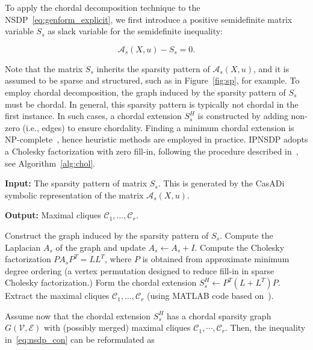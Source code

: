 \documentclass[]{interact}
\theoremstyle{plain}%
\theoremstyle{definition}
\theoremstyle{remark}
\begin{document}
To apply the chordal decomposition technique to the NSDP~\eqref{eq:genform_explicit}, we first introduce a positive semidefinite matrix variable $S_s$  as slack variable for  the  semidefinite inequality:

\begin{equation}\label{eq:nsdp_con}
\mathcal{A}_s(X,u) -S_s =0.
\end{equation}

Note that the matrix $S_s$ inherits the sparsity pattern of $\mathcal{A}_s(X,u)$, and it is assumed to be sparse and structured, such as in Figure~\ref{fig:sp}, for example. To employ chordal decomposition, the graph induced by the sparsity pattern of $S_s$ must be chordal. In general, this sparsity pattern is typically not chordal in the first instance. In such cases, a chordal extension $S_s^H$ is constructed by adding non-zero (i.e., edges) to ensure chordality. Finding a minimum chordal extension is NP-complete~\cite{Yannakakis81}, hence heuristic methods are employed in practice. IPNSDP adopts a Cholesky factorization with zero fill-in, following the procedure described in~\cite{Constante21}, see Algorithm~\ref{alg:chol}.

\begin{algorithm}
\caption{Chordal extension and decomposition}
\label{alg:chol}
\textbf{Input:} The sparsity pattern of matrix $S_s$. This is generated by the CasADi symbolic representation of  the matrix $\mathcal{A}_s(X,u)$.

\textbf{Output:} Maximal cliques $\mathcal{C}_1, \dots, \mathcal{C}_r$.

\begin{algorithmic}[1]
  \State Construct the graph induced by the sparsity pattern of $S_s$.
  \State Compute the Laplacian $A_s$ of the graph and update $A_s \gets A_s + I$.
  \State Compute the Cholesky factorization $P A_s P^T = L L^T$, where $P$ is obtained from approximate minimum degree ordering (a vertex permutation designed to reduce fill-in in sparse Cholesky factorization.)
  \State Form the chordal extension $S_s^H \gets P^T (L + L^T) P$.
  \State Extract the maximal cliques $\mathcal{C}_1, \dots, \mathcal{C}_r$ (using MATLAB code based on~\cite{maxclique}).
\end{algorithmic}
\end{algorithm}

Assume now that the chordal extension $S_s^H$ has a chordal sparsity graph $G(\mathcal{V}, \mathcal{E})$ with (possibly merged) maximal cliques $\mathcal{C}_1, \cdots, \mathcal{C}_r$.  Then, the inequality in~\eqref{eq:nsdp_con} can be reformulated as
\end{document}
